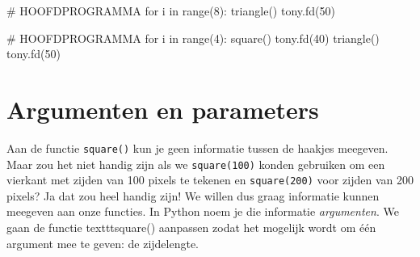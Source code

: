 \documentclass[../main]{subfiles}
\begin{document}
\begin{antwoord}
\begin{qlist}[leftmargin=1.5cm, labelwidth=1.5cm]
\item
\begin{python-breakable}[style=mu-noframe, firstnumber=17, aboveskip=0pt]
# HOOFDPROGRAMMA
for i in range(8):
    triangle()
    tony.fd(50)
\end{python-breakable}
\item
\begin{python-breakable}[style=mu-noframe, firstnumber=17, aboveskip=0pt]
# HOOFDPROGRAMMA
for i in range(4):
    square()
    tony.fd(40)
    triangle()
    tony.fd(50)
\end{python-breakable}
\end{qlist}
\end{antwoord}
\vspace{2\baselineskip}
\section{Argumenten en parameters}%
\label{sec:argumenten-en-parameters}

Aan de functie \texttt{square()} kun je geen informatie tussen de haakjes meegeven. Maar zou het niet handig zijn als we \texttt{square(100)} konden gebruiken om een vierkant met zijden van 100 pixels te tekenen en \texttt{square(200)} voor zijden van 200 pixels? Ja dat zou heel handig zijn! We willen dus graag informatie kunnen meegeven aan onze functies. In Python noem je die informatie \emph{argumenten}. We gaan de functie texttt{square()} aanpassen zodat het mogelijk wordt om één argument mee te geven: de zijdelengte.
\end{document}
